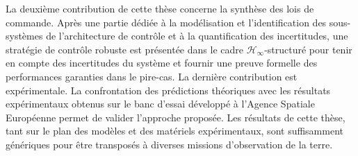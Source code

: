 La deuxième contribution de cette thèse concerne la synthèse des lois de commande. Après une partie dédiée à la modélisation et l’identification des sous-systèmes de l’architecture de contrôle et à la quantification des incertitudes, une stratégie de contrôle robuste est présentée dans le cadre $\mathcal{H}_{\infty}$-structuré pour tenir en compte des incertitudes du système et fournir une preuve formelle des performances garanties dans le pire-cas.  
La dernière contribution est expérimentale. La confrontation des  prédictions théoriques avec les résultats expérimentaux obtenus sur le banc d’essai développé à l’Agence Spatiale Européenne permet de  valider l'approche proposée.  
Les résultats de cette thèse, tant sur le plan des modèles et des matériels expérimentaux, sont suffisamment génériques pour être transposés à diverses missions d'observation de la terre.
